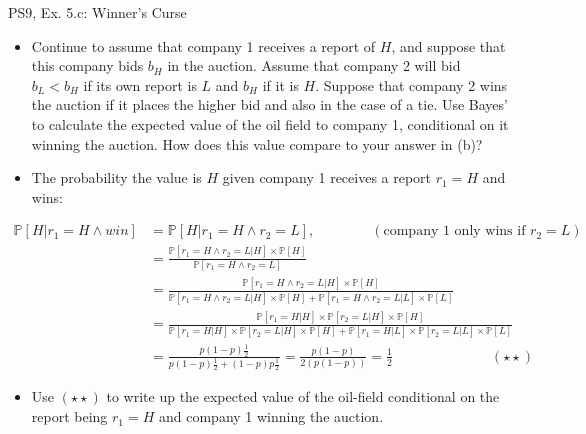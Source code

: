 \begin{frame}{PS9, Ex. 5.c: Winner's Curse}
      \begin{itemize}
        \item[(c)] Continue to assume that company 1 receives a report of $H$, and suppose that this company bids $b_H$ in the auction. Assume that company 2 will bid $b_L < b_H$ if its own report is $L$ and $b_H$ if it is $H$. Suppose that company 2 wins the auction if it places the higher bid and also in the case of a tie. Use Bayes’ to calculate the expected value of the oil field to company 1, conditional on it winning the auction. How does this value compare to your answer in (b)?
        \item[Step 1:] The probability the value is $H$ given company 1 receives a report $r_1=H$ and wins:
        \end{itemize}
        \vspace{-12pt}
        \begin{align*}
            \mathbb{P}[H|r_1=H\wedge win]&=\mathbb{P}[H|r_1=H\wedge r_2=L],\quad\quad\quad\quad(\text{company 1 only wins if }r_2=L)\\
            &=\frac{\mathbb{P}[r_1=H\wedge r_2=L|H]\times\mathbb{P}[H]}{\mathbb{P}[r_1=H\wedge r_2=L]}&\\
            &=\frac{\mathbb{P}[r_1=H\wedge r_2=L|H]\times\mathbb{P}[H]}{\mathbb{P}[r_1=H\wedge r_2=L|H]\times\mathbb{P}[H]+\mathbb{P}[r_1=H\wedge r_2=L|L]\times\mathbb{P}[L]}&\\
            &=\frac{\mathbb{P}[r_1=H|H]\times\mathbb{P}[r_2=L|H]\times\mathbb{P}[H]}{\mathbb{P}[r_1=H|H]\times\mathbb{P}[r_2=L|H]\times\mathbb{P}[H]+\mathbb{P}[r_1=H|L]\times\mathbb{P}[r_2=L|L]\times\mathbb{P}[L]}&\\
            &=\frac{p(1-p)\frac{1}{2}}{p(1-p)\frac{1}{2}+(1-p)p\frac{1}{2}}=\frac{p(1-p)}{2(p(1-p))}=\frac{1}{2}\quad\quad\quad\quad\quad\quad\quad(\star\star)
        \end{align*}
        \vspace{-12pt}
        \begin{itemize}
        \item[Step 2:] Use $(\star\star)$ to write up the expected value of the oil-field conditional on the report being $r_1=H$ and company 1 winning the auction.
      \end{itemize}
      \vfill\null
\end{frame}
